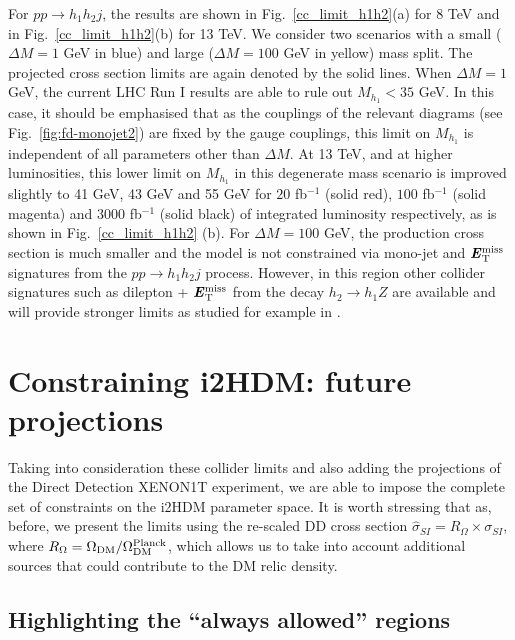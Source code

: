 \documentclass[12pt,a4paper]{article}
\newcommand{\MET}{\textbf{\textit{E}$_{\rm T}^{\rm miss}$}}
\begin{document}
For $pp\rightarrow h_1h_2 j$, the results are shown in Fig.~\ref{cc_limit_h1h2}(a) for 8 TeV and in Fig.~\ref{cc_limit_h1h2}(b) for 13 TeV. We consider two scenarios with a small ($\Delta M =1$ GeV in blue) and large ($\Delta M =100$ GeV in yellow) mass split. The projected cross section limits are again denoted by the solid lines. When $\Delta M = 1$ GeV, the current LHC Run I results are able to rule out $M_{h_1} < 35$ GeV. In this case, it should be emphasised that as the couplings of the relevant diagrams (see Fig.~\ref{fig:fd-monojet2}) are fixed by the gauge couplings, this limit on $M_{h_1}$ is independent of all parameters other than $\Delta M$. At 13 TeV, and at higher luminosities, this lower limit on $M_{h_1}$ in this degenerate mass scenario is improved slightly to 41 GeV, 43 GeV and 55 GeV for $20$ fb$^{-1}$ (solid red), $100$ fb$^{-1}$ (solid magenta) and $3000$ fb$^{-1}$ (solid black) of integrated luminosity respectively, as is shown in Fig.~\ref{cc_limit_h1h2} (b). For $\Delta M = 100$ GeV, the production cross section is much smaller and the model is not constrained via mono-jet and $\MET{}$ signatures from the $pp\rightarrow h_1h_2 j$ process. However, in this region other collider signatures such as dilepton + $\MET{}$ from the decay $h_2 \to h_1Z$ are available and will provide stronger limits as studied for example in \cite{Belanger:2015kga}.


%
%
\section{Constraining i2HDM: future projections}

Taking into consideration these collider limits and also adding the projections of the Direct Detection XENON1T experiment,
we are able to impose the complete set of constraints on the i2HDM parameter space. 
It is worth stressing that as,  before, we  present the limits using  the re-scaled DD cross section 
$\hat{\sigma}_{SI}= R_\Omega\times \sigma_{SI}$, where $R_\Omega = \Omega_{\rm DM}/\Omega^{\rm Planck}_{\rm DM}$, which allows us to take into account additional sources that could contribute to the DM relic density. 

\subsection{Highlighting the ``always allowed'' regions}
\end{document}
